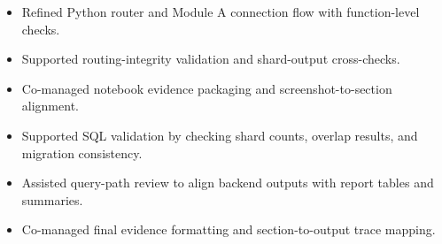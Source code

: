 \documentclass[a4paper,12pt]{article}
\begin{document}
\begin{minipage}[t]{0.49\textwidth}
\vspace{0pt}
\begin{tcolorbox}[
  enhanced,
  colback=white,
  colframe=successgreen!55!black,
  boxrule=0.75pt,
  arc=4pt,
  left=5pt,right=5pt,top=4pt,bottom=4pt,
  title={\faIcon{check-circle}\enspace\textbf{Krina Paghadar}},
  colbacktitle=successgreen!12,
  coltitle=successgreen!55!black,
  fonttitle=\small\bfseries
]
\begin{itemize}[nosep,leftmargin=*,label=\textcolor{successgreen!60!black}{\tiny{}}]
  \item Refined Python router and Module A connection flow with function-level checks.
  \item Supported routing-integrity validation and shard-output cross-checks.
  \item Co-managed notebook evidence packaging and screenshot-to-section alignment.
\end{itemize}
\end{tcolorbox}
\end{minipage}\hfill
\begin{minipage}[t]{0.49\textwidth}
\vspace{0pt}
\begin{tcolorbox}[
  enhanced,
  colback=white,
  colframe=iitgngold!70!black,
  boxrule=0.75pt,
  arc=4pt,
  left=5pt,right=5pt,top=4pt,bottom=4pt,
  title={\faIcon{check}\enspace\textbf{Chintan Bhikhabhai Akhaja}},
  colbacktitle=iitgngold!12,
  coltitle=iitgngold!75!black,
  fonttitle=\small\bfseries
]
\begin{itemize}[nosep,leftmargin=*,label=\textcolor{iitgngold!75!black}{\tiny{}}]
  \item Supported SQL validation by checking shard counts, overlap results, and migration consistency.
  \item Assisted query-path review to align backend outputs with report tables and summaries.
  \item Co-managed final evidence formatting and section-to-output trace mapping.
\end{itemize}
\end{tcolorbox}
\end{minipage}

\vspace{4pt}
\end{document}
